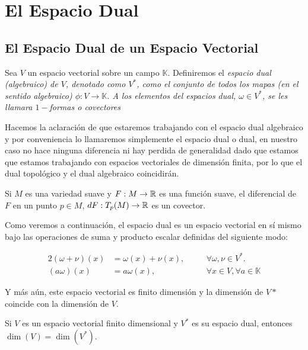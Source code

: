 \section{El Espacio Dual}\label{Sección: Espacio Dual}
\subsection{El Espacio Dual de un Espacio Vectorial}

\begin{definition}
  Sea $V$ un espacio vectorial sobre un campo $\mathbb{K}$. Definiremos el \it{espacio dual (algebraico) de $V$}, denotado como $V^*$, como el conjunto de todos los mapas (en el sentido algebraico) $\phi: V \to \mathbb{K}$. A los elementos del espacios dual, $\omega \in V^*$, se les llamara \it{$1-$formas} o \it{covectores}
\end{definition}

Hacemos la aclaración de que estaremos trabajando con el espacio dual algebraico y por conveniencia lo llamaremos simplemente el espacio dual o dual, en nuestro caso no hace ninguna diferencia ni hay perdida de generalidad dado que estamos que estamos trabajando con espacios vectoriales de dimensión finita, por lo que el dual topológico y el dual algebraico coincidirán.

\begin{example}
  Si $M$ es una variedad suave y $F: M \to \mathbb{R}$ es una función suave, el diferencial de $F$ en un punto $p \in M$, $dF: T_p(M) \to \mathbb{R}$ es un covector.
\end{example}

Como veremos a continuación, el espacio dual es un espacio vectorial en sí mismo bajo las operaciones de suma y producto escalar definidas del siguiente modo:

\begin{alignat*}{2}
  (\omega+\nu)(x)&=\omega(x)+\nu(x), \quad &&\forall \omega,\nu \in V^{*}. \\
  (a\omega)(x) &= a\omega(x), \quad &&\forall x\in V,\forall a \in\mathbb{K}
\end{alignat*}

Y más aún, este espacio vectorial es finito dimensión y la dimensión de $V*$ coincide con la dimensión de $V$.

\begin{theorem}
  Si $V$ es un espacio vectorial finito dimensional y $V^{*}$ es su espacio dual, entonces $\dim(V) = \dim(V^{*})$.
\end{theorem}

